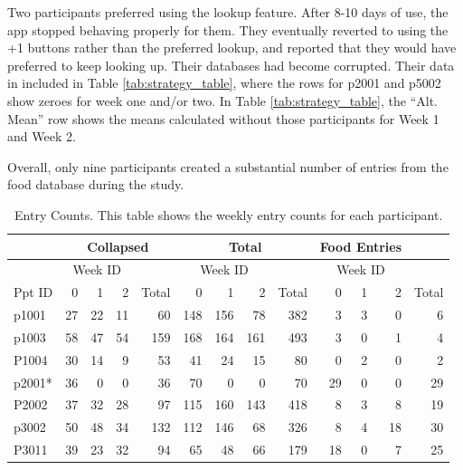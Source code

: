 Two participants  preferred using the lookup feature. After 8-10 days of use, the app stopped behaving properly for them. They eventually reverted to using the +1 buttons rather than the preferred lookup, and reported that they would have preferred to keep looking up. Their databases had become corrupted. Their data in included in Table \ref{tab:strategy_table}, where the rows for p2001 and p5002 show zeroes for week one and/or two. In Table \ref{tab:strategy_table}, the ``Alt. Mean'' row shows the means calculated without those participants for Week 1 and Week 2. 

Overall, only nine participants created a substantial number of entries from the food database during the study.  

\begin{table}[htbp]
\small
  \centering
  \caption[Entry Counts. ]{Entry Counts. This table shows the weekly entry counts for each participant. }
    \begin{tabular}{lrrrrrrrrrrrr}
    \toprule
          & \multicolumn{4}{c}{Collapsed} & \multicolumn{4}{c}{Total}     & \multicolumn{3}{c}{Food Entries} &  \\
    \midrule
          & \multicolumn{3}{c}{Week ID} & \multicolumn{1}{c}{} & \multicolumn{3}{c}{Week ID} & \multicolumn{1}{c}{} & \multicolumn{3}{c}{Week ID} &  \\
    Ppt ID & 0     & 1     & 2     & Total & 0     & 1     & 2     & Total & 0     & 1     & 2     & Total \\
    p1001 & 27    & 22    & 11    & 60    & 148   & 156   & 78    & 382   & 3     & 3     & 0     & 6 \\
    p1003 & 58    & 47    & 54    & 159   & 168   & 164   & 161   & 493   & 3     & 0     & 1     & 4 \\
    P1004 & 30    & 14    & 9     & 53    & 41    & 24    & 15    & 80    & 0     & 2     & 0     & 2 \\
    p2001* & 36    & 0     & 0     & 36    & 70    & 0     & 0     & 70    & 29    & 0     & 0     & 29 \\
    P2002 & 37    & 32    & 28    & 97    & 115   & 160   & 143   & 418   & 8     & 3     & 8     & 19 \\
    p3002 & 50    & 48    & 34    & 132   & 112   & 146   & 68    & 326   & 8     & 4     & 18    & 30 \\
    P3011 & 39    & 23    & 32    & 94    & 65    & 48    & 66    & 179   & 18    & 0     & 7     & 25 \\

\end{tabular}
\end{table}
